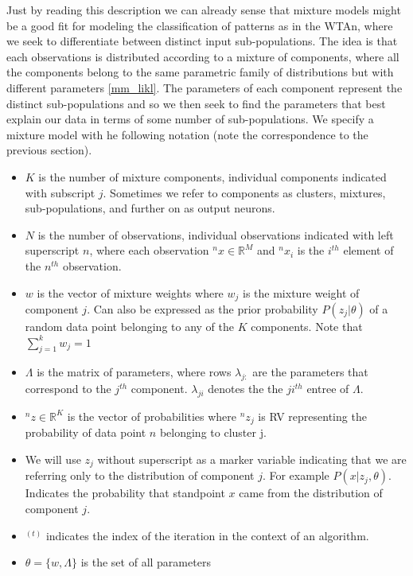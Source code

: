\documentclass{article}
\begin{document}
Just by reading this description we can already sense that mixture
models might be a good fit for modeling the classification of patterns as
in the WTAn, where we seek to differentiate between distinct input sub-populations. The idea is
that each observations is distributed according to a mixture of components, where all the components belong to the same parametric family of distributions but with different parameters \eqref{mm_likl}. The parameters of each component represent the distinct sub-populations and so we then seek to find the parameters that best explain our data in terms of some number of sub-populations. We specify a mixture model with he following notation (note the correspondence to the previous section).

\begin{itemize}
\item
  \(K\) is the number of mixture components, individual components indicated
  with subscript \(j\). Sometimes we refer to components as clusters, mixtures, sub-populations, and further on as output neurons. 
\item
  \(N\) is the number of observations, individual observations indicated with
  left superscript \(n\), where each observation
  $^nx \in \mathbb{R}^M$ and \(^nx_i\) is the \(i^{th}\)
  element of the \(n^{th}\) observation.
\item
  \(w\) is the vector of mixture weights
  where \(w_j\) is the mixture weight of component \(j\). Can also be
  expressed as the prior probability \(P(z_j|\theta)\) of a random data
  point belonging to any of the \(K\) components. Note that
  \(\sum_{j=1}^k w_j = 1\)
\item
  \(\Lambda\) is the matrix of parameters, where rows
  \(\lambda_{j:}\) are the parameters that correspond to the $j^{th}$ component.
  \(\lambda_{ji}\) denotes the the \(ji^{th}\) entree of $\Lambda$.
\item
  $^nz \in \mathbb{R}^K$ is the vector of probabilities where \(^nz_j\) is
  RV representing the probability of data point \(n\) belonging to
  cluster j.
\item
We will use $z_j$ without superscript as a marker variable indicating that we are referring only to the distribution of component $j$. For example $P(x | z_j , \theta)$. Indicates the probability that standpoint $x$ came from the distribution of component $j$.
\item
  $^{(t)}$ indicates the index of the iteration in the context of an algorithm.
\item
  \(\theta = \{w, \Lambda\}\) is the set of all parameters
\end{itemize}
\end{document}
